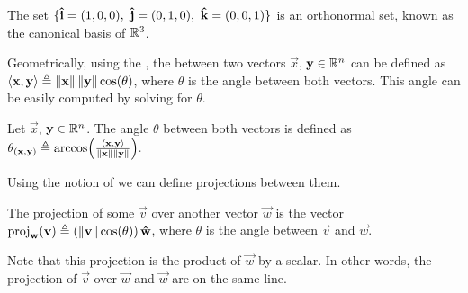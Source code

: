 \begin{example}
    The set $\{ \mathbf{\hat{i}} = (1, 0, 0),\ \mathbf{\hat{j}} = (0, 1, 0),\ \mathbf{\hat{k}} = (0, 0, 1) \}$ is an orthonormal set, known as the canonical 
    basis of $\R^3$.
\end{example}


Geometrically, using the , the  between two vectors $\vec{x}$, $\vec{y}\in
\Rtn$ can be defined as $\langle \mathbf{x}, \mathbf{y} \rangle\triangleq\left\Vert \mathbf{x} \right\Vert\left\Vert \mathbf{y} \right\Vert\cos(\theta)$, where $\theta$ is the 
angle between both vectors. This angle can be easily computed by solving for $\theta$.

\begin{defn}\label{def:angle-vectors}
    Let $\vec{x}$, $\vec{y}\in\Rtn$. The angle $\theta$ between both vectors is defined as $\theta_{(\mathbf{x}, \mathbf{y})}
    \triangleq\arccos(\frac{\langle \mathbf{x}, \mathbf{y} \rangle}{\left\Vert \mathbf{x} \right\Vert\left\Vert \mathbf{y} \right\Vert}).$
\end{defn}

Using the notion of  we can define projections between them.

\begin{defn}\label{def:orthogonal-projection}
    The projection of some $\vec{v}$ over another vector $\vec{w}$ is the vector $\ovproj{\vec{w}}{\vec{v}}\bydef\left(
    \vnorm{\vec{v}}\cos(\theta)\right)
    \uvec{w}$, where $\theta$ is the angle between $\vec{v}$ and $\vec{w}$.
\end{defn}

\begin{remark}
    Note that this projection is the product of $\vec{w}$ by a scalar. In other words, the projection of $\vec{v}$ over
    $\vec{w}$ and $\vec{w}$ are on the same line.
\end{remark}

